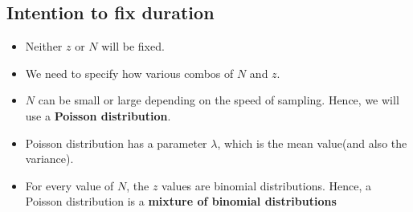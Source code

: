 \documentclass[a4paper]{article}
\begin{document}
\subsection{Intention to fix duration}
\begin{itemize}
    \item Neither $z$ or $N$ will be fixed.
    \item We need to specify how various combos of $N $ and $ z$. 
    \item $N$ can be small or large depending on the speed of sampling. Hence, we will use a \textbf{Poisson distribution}. 
    \item Poisson distribution has a parameter $\lambda$, which is the mean value(and also the variance).
    \item For every value of $N$, the $z$ values are binomial distributions. Hence, a Poisson distribution is a \textbf{mixture of binomial distributions}  
\end{itemize}
\end{document}
